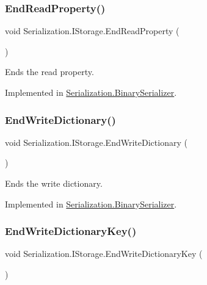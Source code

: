 \subsubsection{\texorpdfstring{End\+Read\+Property()}{EndReadProperty()}}
{\footnotesize\ttfamily void Serialization.\+I\+Storage.\+End\+Read\+Property (\begin{DoxyParamCaption}{ }\end{DoxyParamCaption})}



Ends the read property. 



Implemented in \hyperlink{class_serialization_1_1_binary_serializer_a0b50b703f7b33e2b60421611a3757716}{Serialization.\+Binary\+Serializer}.

\mbox{\label{interface_serialization_1_1_i_storage_ad04875ff178a85ce0054eab86a277fd3}} 
\subsubsection{\texorpdfstring{End\+Write\+Dictionary()}{EndWriteDictionary()}}
{\footnotesize\ttfamily void Serialization.\+I\+Storage.\+End\+Write\+Dictionary (\begin{DoxyParamCaption}{ }\end{DoxyParamCaption})}



Ends the write dictionary. 



Implemented in \hyperlink{class_serialization_1_1_binary_serializer_a16b991b1614cfe83fbb7479b0de03368}{Serialization.\+Binary\+Serializer}.

\mbox{\label{interface_serialization_1_1_i_storage_a67dd08c902044dab8fbc00ee081e4908}} 
\subsubsection{\texorpdfstring{End\+Write\+Dictionary\+Key()}{EndWriteDictionaryKey()}}
{\footnotesize\ttfamily void Serialization.\+I\+Storage.\+End\+Write\+Dictionary\+Key (\begin{DoxyParamCaption}{ }\end{DoxyParamCaption})}



